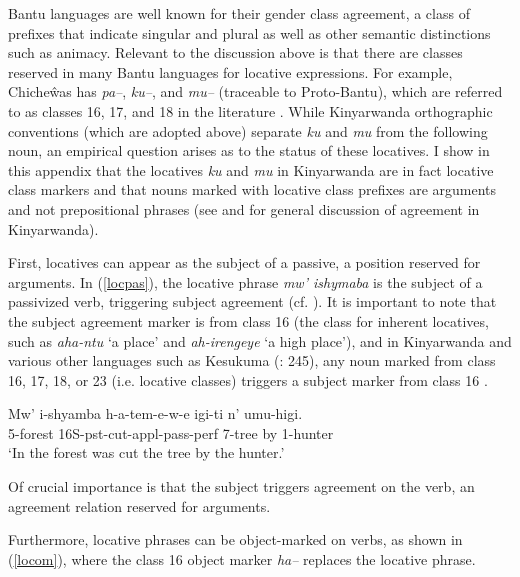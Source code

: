 \documentclass[output=paper]{langsci/langscibook}
\begin{document}
 Bantu languages are well known for their gender class agreement, a class of prefixes that indicate singular and plural as well as other semantic distinctions such as animacy. Relevant to the discussion above is that there are classes reserved in many Bantu languages for locative expressions. For example, Chiche\^was has \emph{pa--}, \emph{ku--}, and \emph{mu--} (traceable to Proto-Bantu), which are referred to as classes 16, 17, and 18 in the literature \citep{bresnan:1989,bresnan:1994,bresnanmchombo:1995,maho:1999,marten:2010}. While Kinyarwanda orthographic conventions (which are adopted above) separate \emph{ku} and \emph{mu} from the following noun, an empirical question arises as to the status of these locatives. I show in this appendix that the locatives \emph{ku} and \emph{mu} in Kinyarwanda are in fact locative class markers and that nouns marked with locative class prefixes are arguments and not prepositional phrases (see \citealt{Jerro2013} and \citealt{JerroWechsler2015} for general discussion of agreement in Kinyarwanda).
 
 
First, locatives can appear as the subject of a passive, a position reserved for arguments. In (\ref{locpas}), the locative phrase \emph{mw' ishymaba} is the subject of a passivized verb, triggering subject agreement (cf. \citealt{bresnan:1989,bresnan:1994}). It is important to note that the subject agreement marker is from class 16 (the class for inherent locatives, such as \emph{aha-ntu} `a place' and \emph{ah-irengeye} `a high place'), and in Kinyarwanda and various other languages such as Kesukuma (\citealt{batibo:1985}: 245), any noun marked from class 16, 17, 18, or 23 (i.e. locative classes) triggers a subject marker from class 16  \citep{maho:1999}.


\begin{exe}

	\ex\label{locpas}\gll Mw' i-shyamba h-a-tem-e-w-e igi-ti n' umu-higi.\\
			{} 5-forest 16S-{\sc pst}-cut-{\sc appl-pass-perf} 7-tree by 1-hunter\\
			\glt `In the forest was cut the tree by the hunter.'

\end{exe}
%
 Of crucial importance is that the subject triggers agreement on the verb, an agreement relation reserved for arguments.  



Furthermore, locative phrases can be object-marked on verbs, as shown in (\ref{locom}), where the class 16 object marker \emph{ha--} replaces the locative phrase. 
\end{document}
